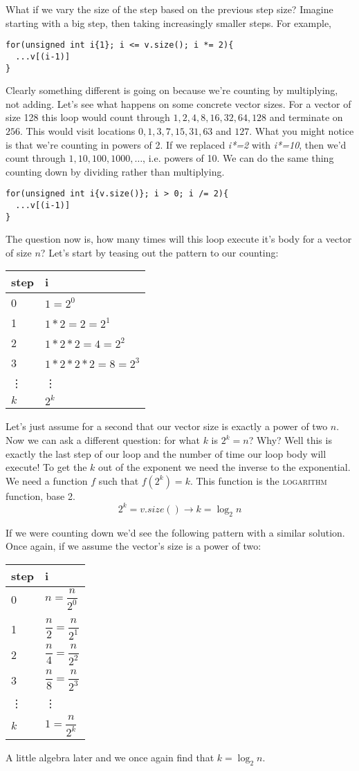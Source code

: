 \documentclass[]{tufte-handout}
\begin{document}
What if we vary the size of the step based on the previous step size? Imagine starting with a big step, then taking increasingly smaller steps. For example,
\begin{verbatim}
for(unsigned int i{1}; i <= v.size(); i *= 2){
  ...v[(i-1)]
}
\end{verbatim}
Clearly something different is going on because we're counting by multiplying, not adding. Let's see what happens on some concrete vector sizes. For a vector of size 128 this loop would count through $1,2,4,8,16,32,64,128$ and terminate on $256$. This would visit locations $0,1,3,7,15,31,63$ and $127$.  What you might notice is that we're counting in powers of 2.  If we replaced \textit{i*=2} with \textit{i*=10}, then we'd count through $1,10,100,1000, \ldots$, i.e. powers of 10. We can do the same thing counting down by dividing rather than multiplying.
\begin{verbatim}
for(unsigned int i{v.size()}; i > 0; i /= 2){
  ...v[(i-1)]
}
\end{verbatim}

The question now is, how many times  will this loop execute it's body for a vector of size $n$? Let's start by teasing out the pattern to our counting:

\begin{tabular}{ll}
step & i \\ \hline
 0 & $1=2^0$ \\
 1 & $1*2=2=2^1$ \\
 2 & $1*2*2=4=2^2$ \\  
 3 & $1*2*2*2=8=2^3$ \\  
 \vdots & \vdots \\
 $k$ & $2^k$ 
\end{tabular}

Let's just assume for a second that our vector size is exactly a power of two $n$. Now we can ask a different question: for what $k$ is $2^k = n$?  Why? Well this is exactly the last step of our loop and the number of time our loop body will execute! To get the $k$ out of the exponent we need the inverse to the exponential. We need a function $f$ such that $f(2^k)=k$. This function is the \textsc{logarithm} function, base 2. 
\[
 2^k = v.size() \rightarrow k = \log_2{n}
\]  

If we were counting down we'd see the following pattern with a similar solution. Once again, if we assume the vector's size is a power of two:
\begin{tabular}{ll}
step & i \\ \hline
 0 & $n=\dfrac{n}{2^0}$ \\ \\
 1 & $\dfrac{n}{2} = \dfrac{n}{2^1}$ \\
 2 & $\dfrac{n}{4} = \dfrac{n}{2^2}$ \\  
 3 & $\dfrac{n}{8} = \dfrac{n}{2^3}$ \\  
 \vdots & \vdots \\
 $k$ & $1 = \dfrac{n}{2^k}$ 
\end{tabular}
A little algebra later and we once again find that $k = \log_2{n}$.
\end{document}
